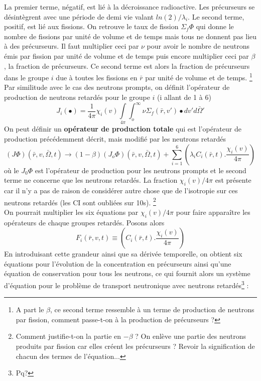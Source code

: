 La premier terme, négatif, est lié à la décroissance radioactive. Les précurseurs se désintègrent 
avec une période de demi vie valant $ln(2)/\lambda_i$. Le second terme, positif, est lié aux fissions. 
On retrouve le taux de fission $\Sigma_f\varPhi$ qui donne le nombre de fissions par unité de volume 
et de temps mais tous ne donnent pas lieu à des précurseurs. Il faut multiplier ceci par $\nu$ pour 
avoir le nombre de neutrons émis par fission par unité de volume et de temps puis encore multiplier ceci par 
$\beta$, la fraction de précurseurs. Ce second terme est alors la fraction de précurseurs dans le groupe $i$ 
due à toutes les fissions en $\bar r$  par unité de volume et de temps.
\footnote{A part le $\beta$, ce second terme ressemble à un terme de production de neutrons par fission,
comment passe-t-on à la production de précurseurs ?}\\

Par similitude avec le cas des neutrons prompts, on définit l'opérateur de production de neutrons 
retardés pour le groupe $i$ (i allant de 1 à 6)
\begin{equation}
{J_i}( \bullet ) = \frac{1}{{4\pi }}{\chi _i}(v)\int\limits_{4\pi }    \int_o^\infty     \nu {\Sigma _f}(\bar r,v') \bullet dv'd\bar \Omega '
\end{equation}
On peut définir un \textbf{opérateur de production totale} qui est l'opérateur de production 
précédemment décrit, mais modifié par les neutrons retardés
\begin{equation}
(J\varPhi )(\bar r,v,\bar \Omega ,t) \to (1 - \beta )({J_o}\varPhi )(\bar r,v,\bar \Omega ,t) + \sum\limits_{i = 1}^6    \left( {{\lambda _i}{C_i}(\bar r,t).\frac{{{\chi _i}(v)}}{{4\pi }}} \right)
\end{equation}
où le $J_0\varPhi$ est l'opérateur de production pour les neutrons prompts et le second terme ne concerne que les 
neutrons retardés. La fraction $\chi_i(v)/4\pi$ est présente car il n'y a pas de raison de considérer 
autre chose que de l'isotropie sur ces  neutrons retardés (les CI sont oubliées sur 10s).
\footnote{Comment justifie-t-on la partie en $-\beta$ ? On enlève une partie des neutrons produits par fission
car elles créent les précurseurs ? Revoir la signification de chacun des termes de l'équation...}\\

On pourrait multiplier les six équations par $\chi_i(v)/4\pi$ pour faire apparaître les opérateurs 
de chaque groupes retardés. Posons alors
\begin{equation}
{F_i}(\bar r,v,t) \equiv \left( {{C_i}(\bar r,t).\frac{{{\chi _i}(v)}}{{4\pi }}} \right)
\end{equation}
En introduisant cette grandeur ainsi que sa dérivée temporelle, on obtient six équations pour l'évolution
de la concentration en précurseurs ainsi qu'une équation de conservation pour tous les neutrons, ce qui
fournit alors un système d'équation pour le problème de transport neutronique avec neutrons retardés\footnote{Pq?} :\\

